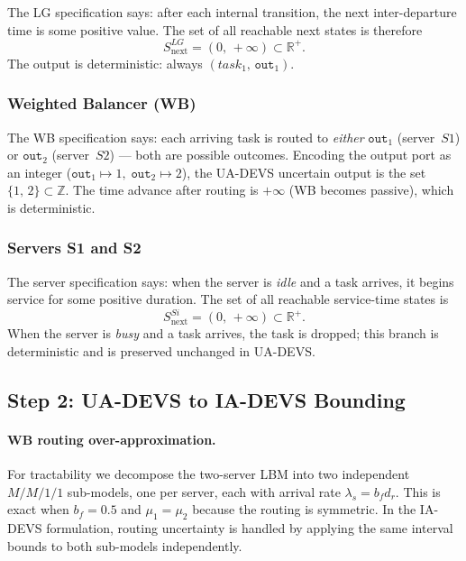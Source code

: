 The LG specification says: after each internal transition, the next
inter-departure time is some positive value.  The set of all reachable
next states is therefore
\[
  S^{LG}_{\text{next}} = (0,\, +\infty) \subset \mathbb{R}^+.
\]
The output is deterministic: always $(\mathit{task}_1,\, \texttt{out}_1)$.

\subsubsection*{Weighted Balancer (WB)}

The WB specification says: each arriving task is routed to
\emph{either} $\texttt{out}_1$ (server~$S1$) or $\texttt{out}_2$
(server~$S2$) — both are possible outcomes.
Encoding the output port as an integer
($\texttt{out}_1 \mapsto 1,\; \texttt{out}_2 \mapsto 2$),
the UA-DEVS uncertain output is the set $\{1,\, 2\} \subset \mathbb{Z}$.
The time advance after routing is $+\infty$ (WB becomes passive),
which is deterministic.

\subsubsection*{Servers S1 and S2}

The server specification says: when the server is \emph{idle} and a
task arrives, it begins service for some positive duration.  The set
of all reachable service-time states is
\[
  S^{Si}_{\text{next}} = (0,\, +\infty) \subset \mathbb{R}^+.
\]
When the server is \emph{busy} and a task arrives, the task is dropped;
this branch is deterministic and is preserved unchanged in UA-DEVS.

\subsection*{Step 2: UA-DEVS to IA-DEVS Bounding}

\paragraph{WB routing over-approximation.}
For tractability we decompose the two-server LBM into two independent
$M/M/1/1$ sub-models, one per server, each with arrival rate
$\lambda_s = b_f d_r$.  This is exact when $b_f = 0.5$ and $\mu_1 = \mu_2$
because the routing is symmetric.  In the IA-DEVS formulation, routing
uncertainty is handled by applying the same interval bounds to both
sub-models independently.


